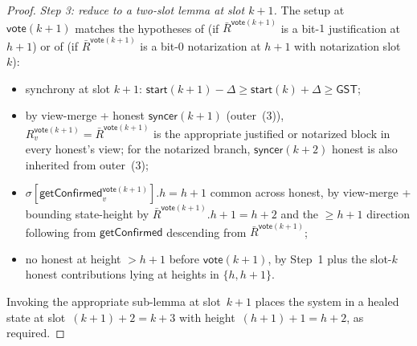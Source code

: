 \documentclass{article}
\newcommand{\syncer}{\mathsf{syncer}}
\newcommand{\start}{\mathsf{start}}
\newcommand{\vote}{\mathsf{vote}}
\newcommand{\comm}[1]{\bar{#1}}
\newcommand{\getConfirmed}{\textsf{getConfirmed}\xspace}
\theoremstyle{plain}
\theoremstyle{definition}
\theoremstyle{remark}
\newcommand{\GST}{\ensuremath{\mathsf{GST}}}
\begin{document}
\begin{proof}
\emph{Step 3: reduce to a two-slot lemma at slot $k+1$.}
The setup at $\vote(k+1)$ matches the hypotheses of  (if $\comm{R}^{\vote(k+1)}$ is a bit-$1$ justification at $h+1$) or of  (if $\comm{R}^{\vote(k+1)}$ is a bit-$0$ notarization at $h+1$ with notarization slot~$k$):
\begin{itemize}
  \item synchrony at slot $k+1$: $\start(k+1) - \Delta \geq \start(k) + \Delta \geq \GST$;
  \item by view-merge + honest $\syncer(k+1)$ (outer~(3)), $R_v^{\vote(k+1)} = \comm{R}^{\vote(k+1)}$ is the appropriate justified or notarized block in every honest's view; for the notarized branch, $\syncer(k+2)$ honest is also inherited from outer~(3);
  \item $\sigma[\getConfirmed_v^{\vote(k+1)}].h = h+1$ common across honest, by view-merge +  bounding state-height by $\comm{R}^{\vote(k+1)}.h + 1 = h+2$ and the $\geq h+1$ direction following from $\getConfirmed$ descending from $\comm{R}^{\vote(k+1)}$;
  \item no honest at height $>h+1$ before $\vote(k+1)$, by Step~1 plus the slot-$k$ honest contributions lying at heights in $\{h, h+1\}$.
\end{itemize}
Invoking the appropriate sub-lemma at slot~$k+1$ places the system in a healed state at slot~$(k+1)+2 = k+3$ with height~$(h+1)+1 = h+2$, as required.
\end{proof}
\end{document}
